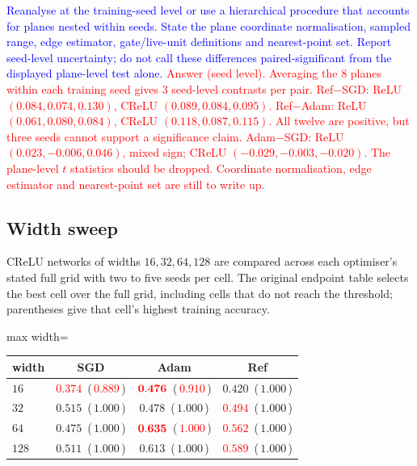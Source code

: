 \documentclass{article}
\newcommand{\zied}[1]{\textcolor{blue}{#1}}
\newcommand{\nat}[1]{\textcolor{red}{#1}}
\theoremstyle{definition}
\theoremstyle{remark}
\begin{document}
\zied{Reanalyse at the training-seed level or use a hierarchical procedure that accounts for planes nested within seeds. State the plane coordinate normalisation, sampled range, edge estimator, gate/live-unit definitions and nearest-point set. Report seed-level uncertainty; do not call these differences paired-significant from the displayed plane-level test alone.}
\nat{Answer (seed level). Averaging the $8$ planes within each training seed gives $3$ seed-level contrasts per pair. Ref$-$SGD: ReLU $(0.084,0.074,0.130)$, CReLU $(0.089,0.084,0.095)$. Ref$-$Adam: ReLU $(0.061,0.080,0.084)$, CReLU $(0.118,0.087,0.115)$. All twelve are positive, but three seeds cannot support a significance claim. Adam$-$SGD: ReLU $(0.023,-0.006,0.046)$, mixed sign; CReLU $(-0.029,-0.003,-0.020)$. The plane-level $t$ statistics should be dropped. Coordinate normalisation, edge estimator and nearest-point set are still to write up.}

\subsection{Width sweep}\label{app:e12}

CReLU networks of widths $16,32,64,128$ are compared across each optimiser's stated full grid with two to five seeds per cell. The original endpoint table selects the best cell over the full grid, including cells that do not reach the threshold; parentheses give that cell's highest training accuracy.

\begin{center}\small
\begin{adjustbox}{max width=\linewidth}
\begin{tabular}{lccc}
\toprule
width & SGD & Adam & Ref \\
\midrule
$16$  & \nat{$0.374$} \,(\,\nat{$0.889$}\,) & $\mathbf{\nat{0.476}}$ \,(\,\nat{$0.910$}\,) & $0.420$ \,(\,$1.000$\,) \\
$32$  & $\mathbf{0.515}$ \,(\,$1.000$\,) & $0.478$ \,(\,$1.000$\,) & \nat{$0.494$} \,(\,$1.000$\,) \\
$64$  & $0.475$ \,(\,$1.000$\,) & $\mathbf{\nat{0.635}}$ \,(\,\nat{$1.000$}\,) & \nat{$0.562$} \,(\,$1.000$\,) \\
$128$ & $0.511$ \,(\,$1.000$\,) & $\mathbf{0.613}$ \,(\,$1.000$\,) & \nat{$0.589$} \,(\,$1.000$\,) \\
\bottomrule
\end{tabular}
\end{adjustbox}
\end{center}
\end{document}
